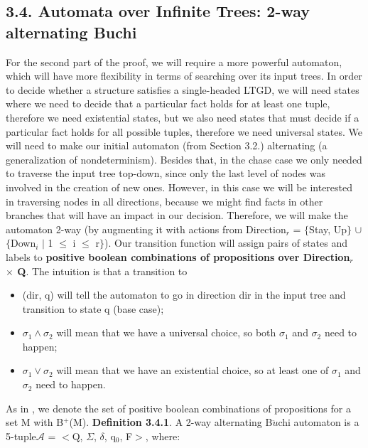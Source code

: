 \documentclass[11pt, a4paper, dvipsnames]{article}
\begin{document}
\subsection{3.4. Automata over Infinite Trees: 2-way alternating Buchi}
For the second part of the proof, we will require a more powerful automaton, which will have more flexibility in terms of searching over its input trees. \newline
In order to decide whether a structure satisfies a single-headed LTGD, we will need states where we need to decide that a particular fact holds for at least one tuple, therefore we need existential states, but we also need states that must decide if a particular fact holds for all possible tuples, therefore we need universal states. We will need to make our initial automaton (from Section 3.2.) alternating (a generalization of nondeterminism). \newline
Besides that, in the chase case we only needed to traverse the input tree top-down, since only the last level of nodes was involved in the creation of new ones. However, in this case we will be interested in traversing nodes in all directions, because we might find facts in other branches that will have an impact in our decision. Therefore, we will make the automaton 2-way (by augmenting it with actions from Direction$_{r}$ = $\{$Stay, Up$\}$ $\cup$ $\{$Down$_{i}$ $|$ 1 $\leq$ i $\leq$ r$\}$). \newline
Our transition function will assign pairs of states and labels to \textbf{positive boolean combinations of propositions over Direction$_{r}$ $\times$ Q}. The intuition is that a transition to 
\begin{itemize}
	\item (dir, q) will tell the automaton to go in direction dir in the input tree and transition to state q (base case);
	\item $\sigma_{1} \wedge \sigma_{2}$ will mean that we have a universal choice, so both $\sigma_{1}$ and $\sigma_{2}$ need to happen;
	\item  $\sigma_{1} \vee \sigma_{2}$ will mean that we have an existential choice, so at least one of $\sigma_{1}$ and $\sigma_{2}$ need to happen.
\end{itemize}
As in \cite{decidable}, we denote the set of positive boolean combinations of propositions for a set M with B$^{+}$(M).\newline
\textbf{Definition 3.4.1}. A 2-way alternating B$\ddot{u}$chi automaton is a 5-tuple\newline $\mathcal{A}$ = $<$Q, $\Sigma$, $\delta$, q$_{0}$, F$>$, where:
\end{document}
